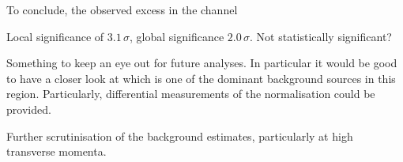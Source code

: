 %
%
%
%
%
%
%

To conclude, the observed excess in the \bbtautau channel

Local significance of $\num{3.1}\,\sigma$, global significance
$\num{2.0}\,\sigma$. Not statistically significant?

Something to keep an eye out for future analyses. In particular it
would be good to have a closer look at \Zjets which is one of the
dominant background sources in this region. Particularly, differential
measurements of the normalisation could be provided.

Further scrutinisation of the background estimates, particularly
\Zjets at high transverse momenta.



